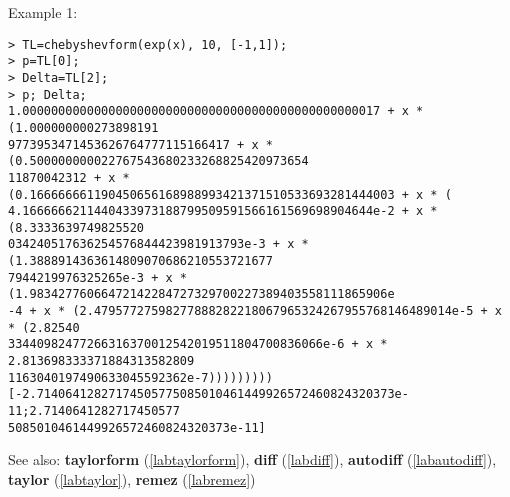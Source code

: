 \noindent Example 1: 
\begin{center}\begin{minipage}{15cm}\begin{Verbatim}[frame=single]
> TL=chebyshevform(exp(x), 10, [-1,1]);
> p=TL[0];
> Delta=TL[2];
> p; Delta;
1.00000000000000000000000000000000000000000000000017 + x * (1.000000000273898191
9773953471453626764777115166417 + x * (0.500000000022767543680233268825420973654
11870042312 + x * (0.166666661190450656168988993421371510533693281444003 + x * (
4.1666666211440433973188799509591566161569698904644e-2 + x * (8.3333639749825520
034240517636254576844423981913793e-3 + x * (1.3888914363614809070686210553721677
7944219976325265e-3 + x * (1.98342776066472142284727329700227389403558111865906e
-4 + x * (2.47957727598277888282218067965324267955768146489014e-5 + x * (2.82540
33440982477266316370012542019511804700836066e-6 + x * 2.813698333371884313582809
1163040197490633045592362e-7)))))))))
[-2.71406412827174505775085010461449926572460824320373e-11;2.7140641282717450577
5085010461449926572460824320373e-11]
\end{Verbatim}
\end{minipage}\end{center}
See also: \textbf{taylorform} (\ref{labtaylorform}), \textbf{diff} (\ref{labdiff}), \textbf{autodiff} (\ref{labautodiff}), \textbf{taylor} (\ref{labtaylor}), \textbf{remez} (\ref{labremez})
